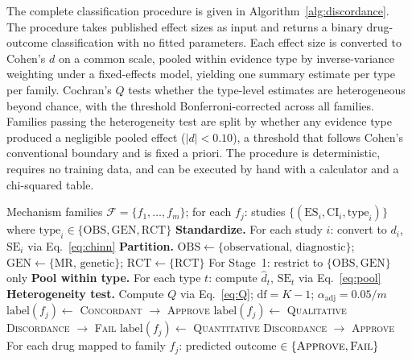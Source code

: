 \documentclass[11pt]{article}
\begin{document}
The complete classification procedure is given in Algorithm~\ref{alg:discordance}. The procedure takes published effect sizes as input and returns a binary drug-outcome classification with no fitted parameters. Each effect size is converted to Cohen's $d$ on a common scale, pooled within evidence type by inverse-variance weighting under a fixed-effects model, yielding one summary estimate per type per family. Cochran's $Q$ tests whether the type-level estimates are heterogeneous beyond chance, with the threshold Bonferroni-corrected across all families. Families passing the heterogeneity test are split by whether any evidence type produced a negligible pooled effect ($|d| < 0.10$), a threshold that follows Cohen's conventional boundary and is fixed a priori. The procedure is deterministic, requires no training data, and can be executed by hand with a calculator and a chi-squared table.

\begin{algorithm}[t]
\caption{Cross-Type Discordance Classification}
\label{alg:discordance}
\begin{algorithmic}[1]
\REQUIRE Mechanism families $\mathcal{F} = \{f_1, \ldots, f_m\}$; for each $f_j$: studies $\{(\text{ES}_i, \text{CI}_i, \text{type}_i)\}$ where $\text{type}_i \in \{\text{OBS}, \text{GEN}, \text{RCT}\}$
\medskip
\STATE \textbf{Standardize.} For each study $i$: convert to $d_i$, $\text{SE}_i$ via Eq.~\ref{eq:chinn}
\STATE \textbf{Partition.} $\text{OBS} \leftarrow \{\text{observational, diagnostic}\}$; $\text{GEN} \leftarrow \{\text{MR, genetic}\}$; $\text{RCT} \leftarrow \{\text{RCT}\}$
\STATE For Stage~1: restrict to $\{\text{OBS}, \text{GEN}\}$ only
\medskip
{}
  \STATE \textbf{Pool within type.} For each type $t$: compute $\hat{d}_t$, $\text{SE}_t$ via Eq.~\ref{eq:pool}
  \STATE \textbf{Heterogeneity test.} Compute $Q$ via Eq.~\ref{eq:Q}; $\text{df} = K - 1$; $\alpha_{\text{adj}} = 0.05 / m$
    \STATE $\text{label}(f_j) \leftarrow$ \textsc{Concordant} $\rightarrow$ \textsc{Approve}
    \STATE $\text{label}(f_j) \leftarrow$ \textsc{Qualitative Discordance} $\rightarrow$ \textsc{Fail}
  \ELSE
    \STATE $\text{label}(f_j) \leftarrow$ \textsc{Quantitative Discordance} $\rightarrow$ \textsc{Approve}
  \ENDIF
\ENDFOR
\medskip
\ENSURE For each drug mapped to family $f_j$: predicted outcome $\in \{\textsc{Approve}, \textsc{Fail}\}$
\end{algorithmic}
\end{algorithm}
\end{document}
